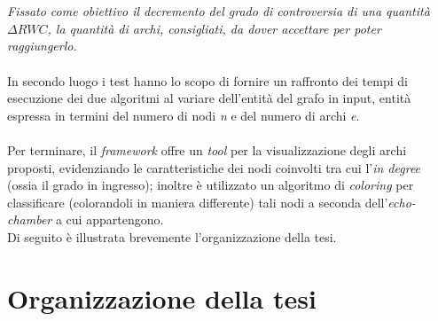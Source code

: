 \\\\
\textit{Fissato come obiettivo il decremento del grado di controversia di una quantità $\Delta RWC$, la quantità di archi, consigliati, da dover accettare per poter raggiungerlo.}
\\\\
In secondo luogo i test hanno lo scopo di fornire un raffronto dei tempi di esecuzione dei due algoritmi al variare dell'entità del grafo in input, entità espressa in termini del numero di nodi \textit{n} e del numero di archi \textit{e}.
\\\\Per terminare, il \textit{framework} offre un \textit{tool} per la visualizzazione degli archi proposti, evidenziando le caratteristiche dei nodi coinvolti tra cui l'\textit{in degree} (ossia il grado in ingresso); inoltre è utilizzato un algoritmo di \textit{coloring} per classificare (colorandoli in maniera differente) tali nodi a seconda dell'\textit{echo-chamber} a cui appartengono.
\\Di seguito è illustrata brevemente l'organizzazione della tesi.
\section{Organizzazione della tesi}
\label{sec:organizzazione}


%



